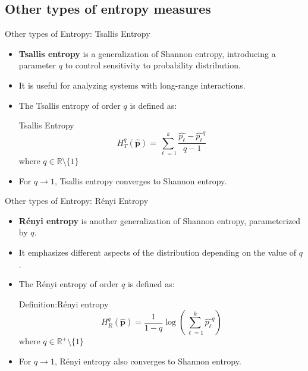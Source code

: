 \documentclass{beamer}
\begin{document}
\subsection{Other types of entropy measures}

\begin{frame}{Other types of Entropy: Tsallis Entropy}
	\begin{itemize}
		\item \textbf{Tsallis entropy} is a generalization of Shannon entropy, introducing a parameter $q$ to control sensitivity to probability distribution.
		\item It is useful for analyzing systems with long-range interactions.
		\item The Tsallis entropy of order $q$ is defined as:
		\begin{block}{Tsallis Entropy}
			\[
			H_{T}^{q}(\widehat{\mathbf{p}}) = \sum_{\ell=1}^{k} \frac{\widehat{p_\ell} - \widehat{p_\ell}^q}{q-1}
			\]
			where $q \in \mathbb{R} \setminus \{1\}$
		\end{block}
		\item For $q \to 1$, Tsallis entropy converges to Shannon entropy.
	\end{itemize}
\end{frame}

\begin{frame}{Other types of Entropy: Rényi Entropy}
	\begin{itemize}
		\item \textbf{Rényi entropy} is another generalization of Shannon entropy, parameterized by $q$.
		\item It emphasizes different aspects of the distribution depending on the value of $q$.
		\item The Rényi entropy of order $q$ is defined as:
		\begin{block}{Definition:Rényi entropy }
			\[
			H_{R}^{q}(\widehat{\mathbf{p}}) = \frac{1}{1-q} \log \left( \sum_{\ell=1}^{k} \widehat{p_\ell}^q \right)
			\]
			where $q \in \mathbb{R}^+ \setminus \{1\}$
		\end{block}
		\item For $q \to 1$, Rényi entropy also converges to Shannon entropy.
	\end{itemize}
\end{frame}
\end{document}
